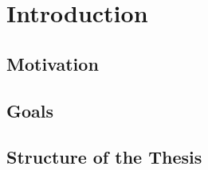 \chapter{Introduction}
\label{cha:Introduction}

\section{Motivation}
\section{Goals}
\section{Structure of the Thesis}
